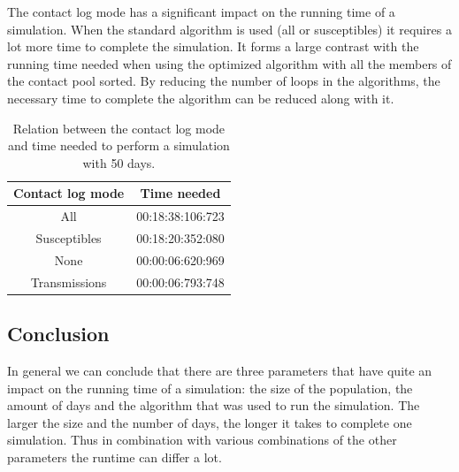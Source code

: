 \documentclass[runningheads]{llncs}
\begin{document}
	The contact log mode has a significant impact on the running time of a simulation. When the standard algorithm is used (all or susceptibles) it requires a lot more time to complete the simulation. It forms a large contrast with the running time needed when using the optimized algorithm with all the members of the contact pool sorted. By reducing the number of loops in the algorithms, the necessary time to complete the algorithm can be reduced along with it.
	\begin{table}
		\caption{Relation between the contact log mode and time needed to perform a simulation with 50 days.}
		\begin{center}
			\begin{tabular}{ | c | c |}
				\hline
				Contact log mode & Time needed \\ \hline
				All & 00:18:38:106:723 \\ \hline
				Susceptibles & 00:18:20:352:080 \\ \hline
				None & 00:00:06:620:969 \\ \hline
				Transmissions & 00:00:06:793:748 \\
				\hline	
			\end{tabular}
		\end{center}
	\end{table}
	
	\subsection{Conclusion}
	In general we can conclude that there are three parameters that have quite an impact on the running time of a simulation: the size of the population, the amount of days and the algorithm that was used to run the simulation. The larger the size and the number of days, the longer it takes to complete one simulation. Thus in combination with various combinations of the other parameters the runtime can differ a lot.
\end{document}
